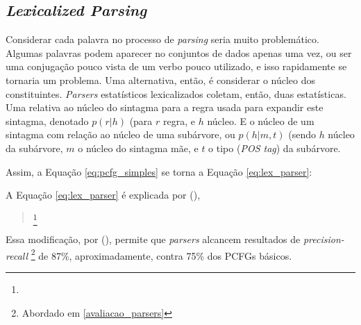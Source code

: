 \subsection{\textit{Lexicalized Parsing}}
\label{lexParsing}

Considerar cada palavra no processo de \textit{parsing} seria muito problemático. Algumas palavras podem aparecer no conjuntos de dados apenas uma vez, ou ser uma conjugação pouco vista de um verbo pouco utilizado, e isso rapidamente se tornaria um problema. Uma alternativa, então, é considerar o núcleo dos constituintes. \cite[p~40]{charniak97statistical} \textit{Parsers} estatísticos lexicalizados coletam, então, duas estatísticas. Uma relativa ao núcleo do sintagma para a regra usada para expandir este sintagma, denotado $p(r|h)$ (para $r$ regra, e $h$ núcleo. E o núcleo de um sintagma com relação ao núcleo de uma subárvore, ou $p(h|m,t)$ (sendo $h$ núcleo da subárvore, $m$ o núcleo do sintagma mãe, e $t$ o tipo (\textit{POS tag}) da subárvore. 

Assim, a Equação \ref{eq:pcfg_simples} se torna a Equação \ref{eq:lex_parser}:
\begin{center}
    
\end{center}

A Equação \ref{eq:lex_parser} é explicada por (\textit{}), 
\begin{quote}
    \footnote{}
\end{quote}

Essa modificação, por (\textit{}), permite que \textit{parsers} alcancem resultados de \textit{precision-recall}
\footnote{Abordado em \ref{avaliacao_parsers}}
de 87\%, aproximadamente, contra 75\% dos PCFGs básicos.